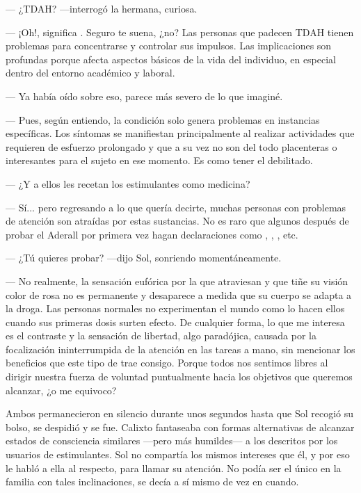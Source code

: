 \documentclass[12pt]{article}
\begin{document}
	--- ¿TDAH? ---interrogó la hermana, curiosa.

	--- ¡Oh!, significa . Seguro te suena, ¿no? Las personas que padecen TDAH
	tienen problemas para concentrarse y controlar sus impulsos. Las
	implicaciones son profundas porque afecta aspectos básicos de la vida
	 del individuo, en especial dentro del entorno
	académico y laboral.

	--- Ya había oído sobre eso, parece más severo de lo que imaginé.

	--- Pues, según entiendo, la condición solo genera problemas en
	instancias específicas. Los síntomas se manifiestan principalmente al
	realizar actividades que requieren de esfuerzo prolongado y que a su vez
	no son del todo placenteras o interesantes para el sujeto en ese
	momento. Es como tener el 
	debilitado.

	--- ¿Y a ellos les recetan los estimulantes como medicina?

	--- Sí... pero regresando a lo que quería decirte, muchas personas con
	problemas de atención son atraídas por estas sustancias. No es raro
	que algunos después de probar el Aderall por primera vez hagan
	declaraciones como , , , etc.

	--- ¿Tú quieres probar? ---dijo Sol, sonriendo momentáneamente.

	--- No realmente, la sensación eufórica por la que atraviesan y que
	tiñe su visión color de rosa no es permanente y desaparece a medida que
	su cuerpo se adapta a la droga. Las personas normales no experimentan el
	mundo como lo hacen ellos cuando sus primeras dosis surten efecto. De
	cualquier forma, lo que me interesa es el contraste y la sensación de
	libertad, algo paradójica, causada por la focalización ininterrumpida de
	la atención en las tareas a mano, sin mencionar los beneficios que este
	tipo de  trae consigo. Porque todos nos sentimos
	libres al dirigir nuestra fuerza de voluntad puntualmente hacia los
	objetivos que queremos alcanzar, ¿o me equivoco?

	Ambos permanecieron en silencio durante unos segundos hasta que Sol
	recogió su bolso, se despidió y se fue. Calixto fantaseaba con formas
	alternativas de alcanzar estados de consciencia similares ---pero más
	humildes--- a los descritos por los usuarios de estimulantes. Sol no
	compartía los mismos intereses que él, y por eso le habló a ella al
	respecto, para llamar su atención. No podía ser el único en la familia
	con tales inclinaciones, se decía a sí mismo de vez en cuando.
\end{document}
